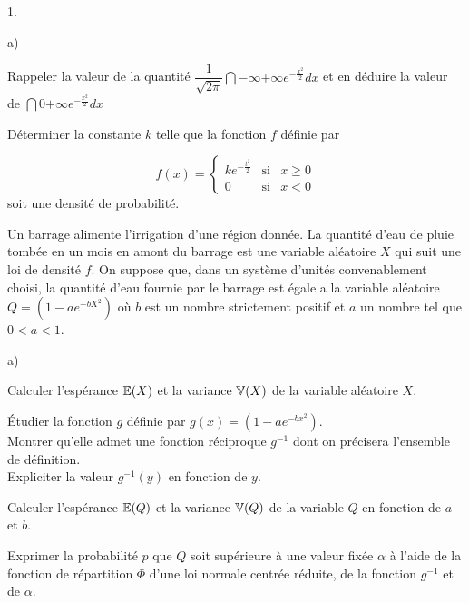 \documentclass[11pt]{article}%
\begin{document}
\begin{noliste}{1.}
 \setlength{\itemsep}{4mm}
\item 

\begin{noliste}{a)}
 \setlength{\itemsep}{2mm}
\item Rappeler la valeur de la quantité ${\dfrac{1}{\sqrt{2\pi
}}}\dint{-\infty }{+ \infty }e^{-{\frac{x^{2}}{2}}}dx$ et en déduire la
valeur de $\dint{0}{+ \infty }e^{-{\frac{x^{2}}{2}}}dx$

\item Déterminer la constante $k$ telle que la fonction $f$ définie par

\[
f(x) = \left\{ 
\begin{array}{rrr}
ke^{-{\frac{t^{2}}{2}}} & \text{si} & x\geq 0 \\
0 & \text{si} & x<0
\end{array}
\right. 
\]
soit une densité de probabilité.
\end{noliste}

\item Un barrage alimente l'irrigation d'une région donnée. La quantité
d'eau de pluie tombée en un mois en amont du barrage est une variable
aléatoire $X$ qui suit une loi de densité $f$. On suppose que, dans un
système
d'unités convenablement choisi, la quantité d'eau fournie par le
barrage est 
égale a la variable aléatoire $Q = (1-ae^{-bX^{2}})$ où $b$ est un
nombre
strictement positif et $a$ un nombre tel que $0<a<1$.

\begin{noliste}{a)}
 \setlength{\itemsep}{2mm}
\item Calculer l'espérance $\mathbb{E}(X)$ et la variance $\mathbb{V}(X)$ de la
variable aléatoire $X$.

\item Étudier la fonction $g$ définie par $g(x) = (1-ae^{-bx^{2}})$.\\
Montrer qu'elle admet une fonction réciproque $g^{-1}$ dont on
précisera
l'ensemble de définition.\\
Expliciter la valeur $g^{-1}(y)$ en fonction de $y$.

\item Calculer l'espérance $\mathbb{E}(Q)$ et la variance $\mathbb{V}(Q)$ de la
variable $Q$
en fonction de $a$ et $b$.
\end{noliste}

\item Exprimer la probabilité $p$ que $Q$ soit supérieure à une valeur
fixée 
$\alpha $ à l'aide de la fonction de répartition $\Phi $ d'une loi
normale
centrée réduite, de la fonction $g^{-1}$ et de $\alpha $.
\end{noliste}

\label{fin}
\end{document}
